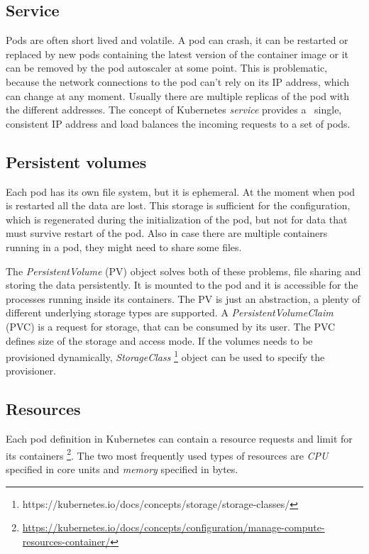 \documentclass[
  digital, %
  twoside, %
  table,   %
  lof,     %
  lot,     %
]{fithesis3}
\begin{document}
\subsection{Service} \label{sec:service}
Pods are often short lived and volatile. A pod can crash, it can be restarted or replaced by new pods containing the latest version of the container image or it can be removed by the pod autoscaler \cite{hpa} at some point. This is problematic, because the network connections to the pod can't rely on its IP address, which can change at any moment. Usually there are multiple replicas of the pod with the different addresses. The concept of Kubernetes \textit{service} provides a \
single, consistent IP address and load balances the incoming requests to a set of pods.

\subsection{Persistent volumes} \label{sec:pv}
Each pod has its own file system, but it is ephemeral. At the moment when pod is restarted all the data are lost. This storage is sufficient for the configuration, which is regenerated during the initialization of the pod, but not for data that must survive restart of the pod. Also in case there are multiple containers running in a pod, they might need to share some files.

The \textit{PersistentVolume} (PV) object solves both of these problems, file sharing and storing the data persistently. It is mounted to the pod and it is accessible for the processes running inside its containers. The PV is just an abstraction, a plenty of different underlying storage types are supported. A \textit{PersistentVolumeClaim} (PVC) is a request for storage, that can be consumed by its user. The PVC defines size of the storage and access mode. If the volumes needs to be provisioned dynamically, \textit{StorageClass} \footnote{https://kubernetes.io/docs/concepts/storage/storage-classes/} object can be used to specify the provisioner.

\subsection{Resources} \label{sec:resources}
Each pod definition in Kubernetes can contain a resource requests and limit for its containers \footnote{\url{https://kubernetes.io/docs/concepts/configuration/manage-compute-resources-container/}}. The two most frequently used types of resources are \textit{CPU} specified in core units and \textit{memory} specified in bytes.
\end{document}
